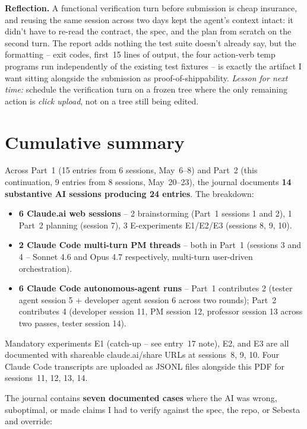 \documentclass[11pt,a4paper]{article}
\newcommand{\field}[1]{\noindent\textbf{#1}}
\begin{document}
\field{Reflection.} A functional verification turn before submission
is cheap insurance, and reusing the same session across two days kept
the agent's context intact: it didn't have to re-read the contract,
the spec, and the plan from scratch on the second turn. The report
adds nothing the test suite doesn't already say, but the formatting
-- exit codes, first~15 lines of output, the four action-verb temp
programs run independently of the existing test fixtures -- is exactly
the artifact I want sitting alongside the submission as
proof-of-shippability. \emph{Lesson for next time:} schedule the
verification turn on a frozen tree where the only remaining action is
\emph{click upload}, not on a tree still being edited.


\section*{Cumulative summary}

Across Part~1 (15 entries from 6 sessions, May~6--8) and Part~2 (this
continuation, 9 entries from 8 sessions, May~20--23), the journal
documents \textbf{14 substantive AI sessions producing 24 entries}.
The breakdown:

\begin{itemize}[leftmargin=*,itemsep=2pt]
  \item \textbf{6 Claude.ai web sessions} -- 2 brainstorming
        (Part~1 sessions 1 and 2), 1 Part~2 planning (session 7),
        3 E-experiments E1/E2/E3 (sessions 8, 9, 10).
  \item \textbf{2 Claude Code multi-turn PM threads} -- both in
        Part~1 (sessions 3 and 4 -- Sonnet 4.6 and Opus 4.7
        respectively, multi-turn user-driven orchestration).
  \item \textbf{6 Claude Code autonomous-agent runs} -- Part~1
        contributes 2 (tester agent session 5 + developer agent
        session 6 across two rounds); Part~2 contributes 4
        (developer session 11, PM session 12, professor session 13
        across two passes, tester session 14).
\end{itemize}

Mandatory experiments E1 (catch-up -- see entry~17 note), E2, and
E3 are all documented with shareable claude.ai/share URLs at
sessions~8, 9, 10. Four Claude Code transcripts are uploaded as
JSONL files alongside this PDF for sessions~11, 12, 13, 14.

The journal contains \textbf{seven documented cases} where the AI was
wrong, suboptimal, or made claims I had to verify against the spec,
the repo, or Sebesta and override:
\end{document}
